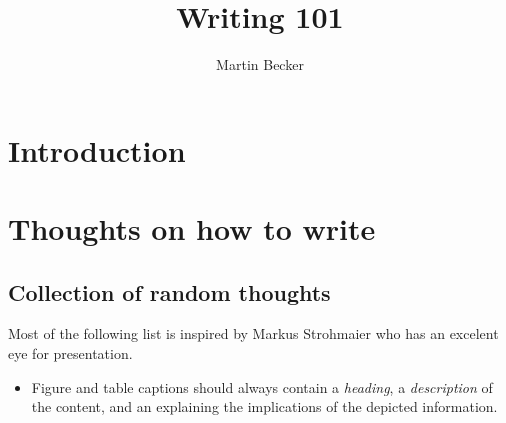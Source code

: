 \documentclass[a4paper]{memoir}
\title{Writing 101}
\author{Martin Becker}
\begin{document}
\tableofcontents

\chapter{Introduction}

\chapter{Thoughts on how to write}
\section{Collection of random thoughts}
Most of the following list is inspired by Markus
Strohmaier who has an excelent eye
for presentation.
\begin{itemize}
	\item Figure and table captions should always contain a \textit{heading}, 
	a \textit{description} of the content, and an 
	explaining the implications of the depicted information.
\end{itemize} 

\listoftodos 

\end{document}
